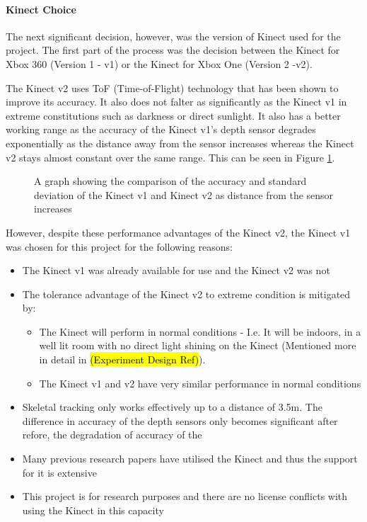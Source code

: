 \paragraph{Kinect Choice}
The next significant decision, however, was the version of Kinect used for the project. The first part of the process was the decision between the Kinect for Xbox 360 (Version 1 - v1) or the Kinect for Xbox One (Version 2 -v2). 

The Kinect v2 uses ToF (Time-of-Flight) technology that has been shown to improve its accuracy. It also does not falter as significantly as the Kinect v1 in extreme constitutions such as darkness or direct sunlight. It also has a better working range as the accuracy of the Kinect v1's depth sensor degrades exponentially as the distance away from the sensor increases whereas the Kinect v2 stays almost constant over the same range. \cite{kinectComp2011} This can be seen in Figure \ref{fig:kinectV1V2Depth}. 

\begin{figure}[ht]
	\centering
	{%
		\setlength{\fboxsep}{0pt}%
		\setlength{\fboxrule}{0.5pt}%
		}
	\caption{A graph showing the comparison of the accuracy and standard deviation of the Kinect v1 and Kinect v2 as distance from the sensor increases \cite{kinectComp2011}}
	\label{fig:kinectV1V2Depth}
\end{figure}

However, despite these performance advantages of the Kinect v2, the Kinect v1 was chosen for this project for the following reasons:

\begin{itemize}
	\item The Kinect v1 was already available for use and the Kinect v2 was not
	\item The tolerance advantage of the Kinect v2 to extreme condition is mitigated by:
	\begin{itemize}
		\item The Kinect will perform in normal conditions - I.e. It will be indoors, in a well lit room with no direct light shining on the Kinect (Mentioned more in detail in \hl{(Experiment Design Ref)}).
		\item The Kinect v1 and v2 have very similar performance in normal conditions \cite{kinectComp2011}
	\end{itemize}
	\item Skeletal tracking only works effectively up to a distance of 3.5m. The difference in accuracy of the depth sensors only becomes significant after refore, the degradation of accuracy  of the 
	\item Many previous research papers have utilised the Kinect and thus the support for it is extensive
	\item This project is for research purposes and there are no license conflicts with using the Kinect in this capacity
\end{itemize}

